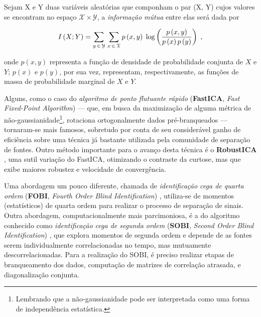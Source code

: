 \begin{definition}
    Sejam X e Y duas variáveis aleatórias que componham o par (X, Y) cujos valores se encontram no espaço $\mathcal{X} \times \mathcal{Y}$, a \textit{informação mútua} entre elas será dada por 

    \begin{equation}
        I\left(X; Y\right) = \sum_{y\hspace{0.05cm} \in\hspace{0.05cm} \mathcal{Y}} \hspace{0.05cm} \sum_{x\hspace{0.05cm} \in\hspace{0.05cm} \mathcal{X}} p\left(x, y\right) \hspace{0.10cm} \log\left(\dfrac{p\left(x, y\right)}{p\left(x\right) p\left(y\right)}\right)
        \hspace{0.1cm},
        \vspace{0.2cm}
        \label{eq:bss_mutual_information}
    \end{equation}

    \noindent onde $p\left(x, y\right)$ representa a função de densidade de probabilidade conjunta de $X$ e $Y$; $p\left(x\right)$ e $p\left(y\right)$, por sua vez, representam, respectivamente, as funções de massa de probabilidade marginal de $X$ e $Y$.

\end{definition}

Alguns, como o caso do \textit{algoritmo de ponto flutuante rápido} (\textbf{FastICA}, \textit{Fast Fixed-Point Algorithm}) \citep{761722} --- que, em busca da maximização de alguma métrica de não-gaussianidade\footnote{Lembrando que a não-gaussianidade pode ser interpretada como uma forma de independência estatística.}, rotaciona ortogonalmente dados pré-branqueados --- tornaram-se mais famosos, sobretudo por conta de seu considerável ganho de eficiência sobre uma técnica já bastante utilizada pela comunidade de separação de fontes. Outro método importante para o avanço desta técnica é o \textbf{RobustICA} \citep{5356190}, uma sutil variação do FastICA, otimizando o contraste da curtose, mas que exibe maiores robustez e velocidade de convergência.

Uma abordagem um pouco diferente, chamada de \textit{identificação cega de quarta ordem} (\textbf{FOBI}, \textit{Fourth Order Blind Identification}) \citep{cardoso1989source, miettinen2015fourth}, utiliza-se de momentos (estatísticos) de quarta ordem para realizar o processo de separação de sinais. Outra abordagem, computacionalmente mais parcimoniosa, é a do algoritmo conhecido como \textit{identificação cega de segunda ordem} (\textbf{SOBI}, \textit{Second Order Blind Identification}) \citep{554307}, que explora momentos de segunda ordem e depende de as fontes serem individualmente correlacionadas no tempo, mas mutuamente descorrelacionadas. Para a realização do SOBI, é preciso realizar etapas de branqueamento dos dados, computação de matrizes de correlação atrasada, e diagonalização conjunta. 

